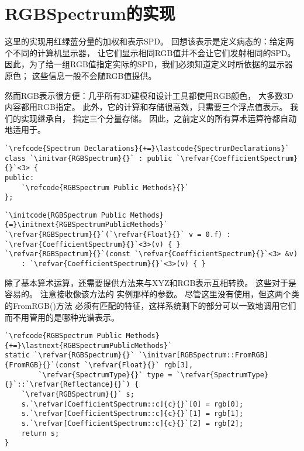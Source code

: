 \section{RGBSpectrum的实现}\label{sec:RGBSpectrum的实现}

这里的实现用红绿蓝分量的加权和表示SPD。
回想该表示是定义病态的：给定两个不同的计算机显示器，
让它们显示相同RGB值并不会让它们发射相同的SPD。
因此，为了给一组RGB值指定实际的SPD，我们必须知道定义时所依据的显示器原色；
这些信息一般不会随RGB值提供。

然而RGB表示很方便：几乎所有3D建模和设计工具都使用RGB颜色，
大多数3D内容都用RGB指定。
此外，它的计算和存储很高效，只需要三个浮点值表示。
我们的实现继承自，
指定三个分量存储。
因此，之前定义的所有算术运算符都自动地适用于。
\begin{lstlisting}
`\refcode{Spectrum Declarations}{+=}\lastcode{SpectrumDeclarations}`
class `\initvar{RGBSpectrum}{}` : public `\refvar{CoefficientSpectrum}{}`<3> {
public:
    `\refcode{RGBSpectrum Public Methods}{}`
};
\end{lstlisting}
\begin{lstlisting}
`\initcode{RGBSpectrum Public Methods}{=}\initnext{RGBSpectrumPublicMethods}`
`\refvar{RGBSpectrum}{}`(`\refvar{Float}{}` v = 0.f) : `\refvar{CoefficientSpectrum}{}`<3>(v) { }
`\refvar{RGBSpectrum}{}`(const `\refvar{CoefficientSpectrum}{}`<3> &v) 
    : `\refvar{CoefficientSpectrum}{}`<3>(v) { }
\end{lstlisting}

除了基本算术运算，还需要提供方法来与XYZ和RGB表示互相转换。
这些对于是容易的。
注意接收像该方法的
实例那样的参数。
尽管这里没有使用，但这两个类的{\ttfamily FromRGB()}方法
必须有匹配的特征，这样系统剩下的部分可以一致地调用它们而不用管用的是哪种光谱表示。
\begin{lstlisting}
`\refcode{RGBSpectrum Public Methods}{+=}\lastnext{RGBSpectrumPublicMethods}`
static `\refvar{RGBSpectrum}{}` `\initvar[RGBSpectrum::FromRGB]{FromRGB}{}`(const `\refvar{Float}{}` rgb[3],
        `\refvar{SpectrumType}{}` type = `\refvar{SpectrumType}{}`::`\refvar{Reflectance}{}`) {
    `\refvar{RGBSpectrum}{}` s;
    s.`\refvar[CoefficientSpectrum::c]{c}{}`[0] = rgb[0];
    s.`\refvar[CoefficientSpectrum::c]{c}{}`[1] = rgb[1];
    s.`\refvar[CoefficientSpectrum::c]{c}{}`[2] = rgb[2];
    return s;
}
\end{lstlisting}

